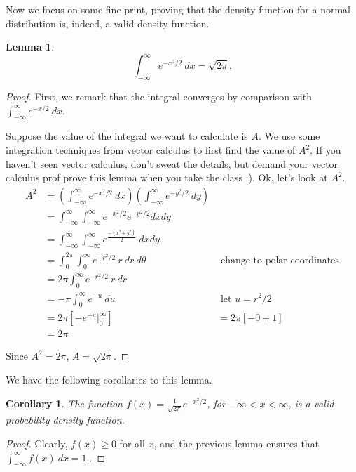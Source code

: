 \documentclass[
]{book}
\newtheorem{lemma}{Lemma}[chapter]
\newtheorem{corollary}{Corollary}[chapter]
\theoremstyle{definition}
\theoremstyle{definition}
\theoremstyle{definition}
\theoremstyle{definition}
\theoremstyle{remark}
\begin{document}
Now we focus on some fine print, proving that the density function for a normal distribution is, indeed, a valid density function.

\begin{lemma}
\[\int_{-\infty}^{\infty} e^{-x^2/2}~dx = \sqrt{2\pi}.\]
\end{lemma}

\begin{proof}
First, we remark that the integral converges by comparison with \(\displaystyle \int_{-\infty}^{\infty} e^{-x/2}~dx.\)

Suppose the value of the integral we want to calculate is \(A\). We use some integration techniques from vector calculus to first find the value of \(A^2\). If you haven't seen vector calculus, don't sweat the details, but demand your vector calculus prof prove this lemma when you take the class :). Ok, let's look at \(A^2\).
\begin{align*}
A^2 &= \left(\int_{-\infty}^{\infty} e^{-x^2/2}~dx \right)\left(\int_{-\infty}^{\infty} e^{-y^2/2}~dy \right)\\
    &= \int_{-\infty}^{\infty} \int_{-\infty}^{\infty} e^{-x^2/2} e^{-y^2/2} dx dy \\
    &= \int_{-\infty}^{\infty} \int_{-\infty}^{\infty} e^\frac{-(x^2+y^2)}{2} ~dx dy \\
    &= \int_0^{2\pi}\int_0^\infty e^{-r^2/2}~r ~dr~ d\theta &\text{ change to polar coordinates}\\
    &= 2\pi \int_0^\infty e^{-r^2/2}~r ~dr \\
    &= -\pi \int_0^\infty e^{-u} ~du & \text{ let } u = r^2/2 \\
    &= 2\pi \left[-e^{-u} \biggr|_0^\infty \right]
    &= 2\pi [-0 + 1] \\
    &= 2\pi
\end{align*}

Since \(A^2 = 2\pi\), \(A = \sqrt{2\pi}\).
\end{proof}

We have the following corollaries to this lemma.

\begin{corollary}
The function \(f(x) = \frac{1}{\sqrt{2\pi}}e^{-x^2/2}\), for \(-\infty < x < \infty\), is a valid probability density function.
\end{corollary}

\begin{proof}
Clearly, \(f(x) \geq 0\) for all \(x\), and the previous lemma ensures that \(\int_{-\infty}^\infty f(x)~dx = 1.\).
\end{proof}
\end{document}
